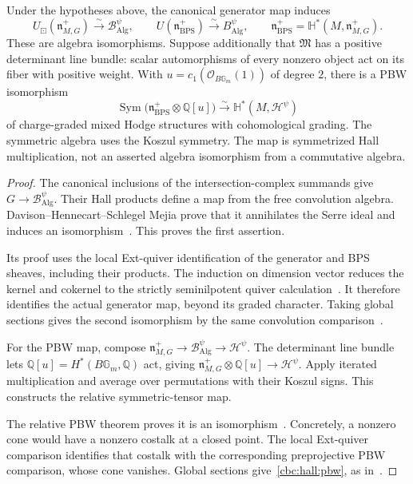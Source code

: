 \begin{theorem}\label{cbc:hall:bps}
Under the hypotheses above, the canonical generator map induces
\[
 U_{\boxdot}(\mathfrak n^+_{M,G})
       \xrightarrow{\sim}\mathscr B_{\mathrm{Alg}}^\psi,
 \qquad
 U(\mathfrak n^+_{\mathrm{BPS}})
       \xrightarrow{\sim}B_{\mathrm{Alg}}^\psi,
 \qquad
 \mathfrak n^+_{\mathrm{BPS}}=\mathbb H^*(M,\mathfrak n^+_{M,G}).
\]
These are algebra isomorphisms.
Suppose additionally that $\mathfrak M$ has a positive determinant line bundle: scalar automorphisms of every nonzero object act on its fiber with positive weight.
With $u=c_1(\mathcal O_{B\mathbb G_m}(1))$ of degree $2$, there is a PBW isomorphism
\begin{equation}\label{cbc:hall:pbw}
 \operatorname{Sym}\bigl(\mathfrak n^+_{\mathrm{BPS}}\otimes\mathbb Q[u]\bigr)
   \xrightarrow{\sim}\mathbb H^*(M,\mathscr H^\psi)
\end{equation}
of charge-graded mixed Hodge structures with cohomological grading.
The symmetric algebra uses the Koszul symmetry.
The map is symmetrized Hall multiplication, not an asserted algebra isomorphism from a commutative algebra.
\end{theorem}
\begin{proof}
The canonical inclusions of the intersection-complex summands give
$G\to\mathscr B_{\mathrm{Alg}}^\psi$.
Their Hall products define a map from the free convolution algebra.
Davison--Hennecart--Schlegel Mejia prove that it annihilates the Serre ideal and induces an isomorphism~\cite[Proposition~7.13 and Theorem~1.1]{DHS}.
This proves the first assertion.

Its proof uses the local Ext-quiver identification of the generator and BPS sheaves, including their products.
The induction on dimension vector reduces the kernel and cokernel to the strictly seminilpotent quiver calculation~\cite[Proposition~7.7, Corollary~7.14, \S7.7.2]{DHS}.
It therefore identifies the actual generator map, beyond its graded character.
Taking global sections gives the second isomorphism by the same convolution comparison~\cite[Theorem~1.2]{DHS}.

For the PBW map, compose
$\mathfrak n^+_{M,G}\to\mathscr B_{\mathrm{Alg}}^\psi\to\mathscr H^\psi$.
The determinant line bundle lets $\mathbb Q[u]=H^*(B\mathbb G_m,\mathbb Q)$ act, giving
$\mathfrak n^+_{M,G}\otimes\mathbb Q[u]\to\mathscr H^\psi$.
Apply iterated multiplication and average over permutations with their Koszul signs.
This constructs the relative symmetric-tensor map.

The relative PBW theorem proves it is an isomorphism~\cite[Theorem~1.7]{DHS}.
Concretely, a nonzero cone would have a nonzero costalk at a closed point.
The local Ext-quiver comparison identifies that costalk with the corresponding preprojective PBW comparison, whose cone vanishes.
Global sections give~\eqref{cbc:hall:pbw}, as in~\cite[Corollary~1.8]{DHS}.
\end{proof}

